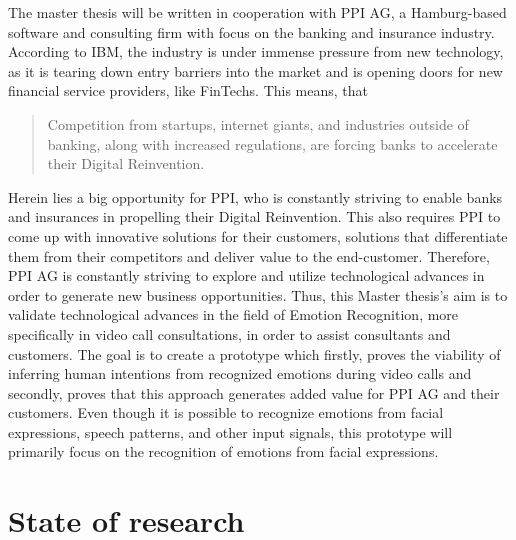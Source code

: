 \documentclass[11pt,a4paper]{scrbook}
\begin{document}
The master thesis will be written in cooperation with PPI AG, a Hamburg-based software and consulting firm with focus on the banking and insurance industry. According to IBM, the industry is under immense pressure from new technology, as it is tearing down entry barriers into the market and is opening doors for new financial service providers, like FinTechs.
\citep{IBM:2020:TheImpactOfDigitization} This means, that
\begin{quote}
Competition from startups, internet giants, and industries outside of banking, along with increased regulations, are forcing banks to accelerate their Digital Reinvention. \citep{IBM:2020:TheImpactOfDigitization}
\end{quote}
\vspace{0.1cm}
Herein lies a big opportunity for PPI, who is constantly striving to enable banks and insurances in propelling their Digital Reinvention. This also requires PPI to come up with innovative solutions for their customers, solutions that differentiate them from their competitors and deliver value to the end-customer.
\newline\newline
Therefore, PPI AG is constantly striving to explore and utilize technological advances in order to generate new business opportunities. Thus, this Master thesis's aim is to validate technological advances in the field of Emotion Recognition, more specifically in video call consultations, in order to assist consultants and customers. The goal is to create a prototype which firstly, proves the viability of inferring human intentions from recognized emotions during video calls and secondly, proves that this approach generates added value for PPI AG and their customers.
\newline\newline
Even though it is possible to recognize emotions from facial expressions, speech patterns, and other input signals, this prototype will primarily focus on the recognition of emotions from facial expressions.


\chapter{State of research}

\end{document}
